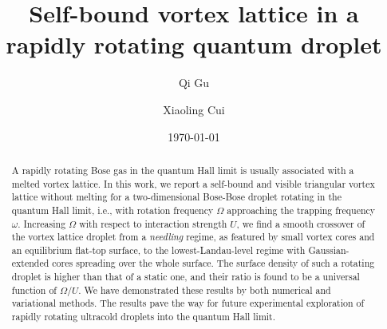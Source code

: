 \documentclass[reprint,aps,pra,twocolumn,superscriptaddress]{revtex4-1}
\begin{document}
\title{Self-bound vortex lattice in a rapidly rotating quantum droplet}
\author{Qi Gu}
\author{Xiaoling Cui}

\date{\today} 


\begin{abstract}
A rapidly rotating Bose gas in the quantum Hall limit is usually associated with a melted vortex lattice. 
In this work, we report a self-bound and visible triangular vortex lattice without melting for a two-dimensional Bose-Bose droplet rotating in the quantum Hall limit, i.e., with rotation frequency $\Omega$ approaching the trapping frequency $\omega$.
Increasing $\Omega$ with respect to interaction strength $U$, we find a smooth crossover of the vortex lattice droplet from a {\it needling} regime, as featured by small vortex cores and an equilibrium flat-top surface, to the lowest-Landau-level regime with Gaussian-extended cores spreading over the whole surface.   
The surface density of such a rotating droplet is higher than that of a static one, and their ratio is found to be a universal function of $\Omega/U$. We have demonstrated these results by both numerical and variational methods. The results pave the way for future experimental exploration of rapidly rotating ultracold droplets into the quantum Hall limit.  
\end{abstract}
\maketitle
\end{document}
